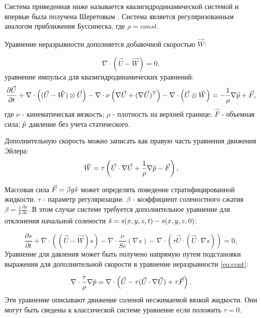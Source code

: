 Система приведенная ниже называется квазигидродинамической системой и впервые была получена Шеретовым \cite{ElSh2001}. Система является регуляризованным аналогом приближения Буссинеска, где $ \rho = const $.

 
Уравнение неразрывности дополняется добавочной скоростью $\vec{W}$:

    \begin{equation}
      \nabla \cdot \left (\vec U - \vec W \right ) = 0,
      \label{eq:cont}
    \end{equation}
уравнение импульса для квазигидродинамических уравнений:
\begin{equation}
      \frac{\partial \vec U}{\partial t} + \nabla \cdot \left ( (\vec U - \vec W)\otimes \vec U  \right )
      -
      \nabla \cdot \nu \left ( \nabla \vec U + (\nabla \vec U)^T \right ) - \nabla \cdot \left  (   \vec U \otimes \vec W \right )
      = 
      - \frac{1}{\rho} \nabla \Tilde{p} + \vec F,
\end{equation}
где $\nu$ - кинематическая вязкость; $\rho$ - плотность на верхней границе; $ \vec{F}$ - объемная сила; $\Tilde{p}$ давление без учета статического.

Дополнительную скорость можно записать как правую часть уравнения движения Эйлера:
\begin{equation}
      \vec W = \tau \left ( \vec U \cdot \nabla \vec U + \frac{1}{\rho} \nabla \Tilde{p} - \vec F  \right ),
      \label{eq:W}
\end{equation}

Массовая сила $\vec{F} = \beta g \Tilde{s}$ может определять поведение стратифицированной жидкости. $ \tau $ - параметр регуляризации. $ \beta $ - коэффициент соленостного сжатия $ \beta = \frac{1}{\rho}\frac{\partial \rho}{\partial s} $. В этом случае системе требуется дополнительное уравнение для отклонения начальной солености $ \Tilde{s} = s (x, y, z, t) - s (x, y, z, 0) $:

\begin{equation}
     \frac{\partial s }{\partial t} + \nabla \cdot \left ( (\vec U - \vec W) s \right )
      - \nabla \cdot \frac{\nu}{Sc} \left ( \nabla s \right ) - \nabla \cdot \left (\tau \vec{U} \cdot (\vec{U} \cdot \nabla s) \right) = 0,
\end{equation}
Уравнение для давления может быть получено напрямую путем подстановки выражения для дополнительной скорости в уравнение неразрывности \ref{eq:cont}:

\begin{equation}
     \nabla \cdot \frac{\tau}{\rho}\nabla \Tilde{p} = \nabla \cdot \left (   \vec{U} - \tau (\vec{U} \cdot \nabla \vec{U}) +  \tau \vec{F} \right ).
\end{equation}
Эти уравнение описывают движение соленой несжимаемой вязкой жидкости. Они могут быть сведены к классической системе уравнение если положить $\tau = 0$.

